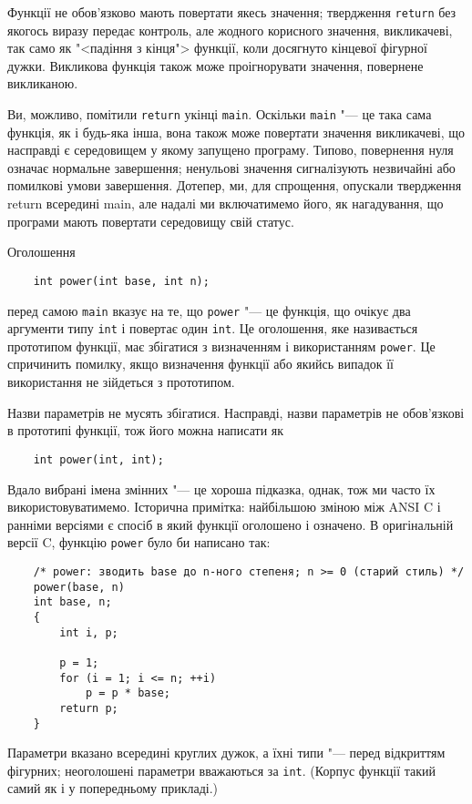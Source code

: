 \documentclass[a4paper,12pt]{book}
\begin{document}
  Функції не обов'язково мають повертати якесь значення; твердження \texttt{return} без
  якогось виразу передає контроль, але жодного корисного значення, викликачеві, так само
  як "<падіння з кінця"> функції, коли досягнуто кінцевої фігурної дужки.
  Викликова функція також може проігнорувати значення, повернене викликаною.

  Ви, можливо, помітили \texttt{return} укінці \texttt{main}. Оскільки \texttt{main}
  "--- це така сама функція, як і будь-яка інша, вона також може повертати значення
  викликачеві, що насправді є середовищем у якому запущено програму. Типово, повернення
  нуля означає нормальне завершення; ненульові значення сигналізують незвичайні або
  помилкові умови завершення. Дотепер, ми, для спрощення, опускали твердження return
  всередині main, але надалі ми включатимемо його, як нагадування, що програми мають
  повертати середовищу свій статус.

  Оголошення
  \begin{verbatim}
    int power(int base, int n);
  \end{verbatim}
  перед самою \texttt{main} вказує на те, що \texttt{power} "--- це функція, що очікує
  два аргументи типу \texttt{int} і повертає один \texttt{int}. Це оголошення, яке
  називається прототипом функції, має збігатися з визначенням і використанням
  \texttt{power}. Це спричинить помилку, якщо визначення функції або якийсь випадок її
  використання не зійдеться з прототипом.

  Назви параметрів не мусять збігатися. Насправді, назви параметрів не обов'язкові в
  прототипі функції, тож його можна написати як
  \begin{verbatim}
    int power(int, int);
  \end{verbatim}

  Вдало вибрані імена змінних "--- це хороша підказка, однак, тож ми часто їх
  використовуватимемо. Історична примітка: найбільшою зміною між ANSI C і ранніми версіями
  є спосіб в який функції оголошено і означено. В оригінальній версії C, функцію
  \texttt{power} було би написано так:
  \begin{verbatim}
    /* power: зводить base до n-ного степеня; n >= 0 (старий стиль) */
    power(base, n)
    int base, n;
    {
        int i, p;

        p = 1;
        for (i = 1; i <= n; ++i)
            p = p * base;
        return p;
    }
  \end{verbatim}

  Параметри вказано всередині круглих дужок, а їхні типи "--- перед відкриттям
  фігурних; неоголошені параметри вважаються за \texttt{int}. (Корпус функції такий самий
  як і у попередньому прикладі.)
\end{document}

